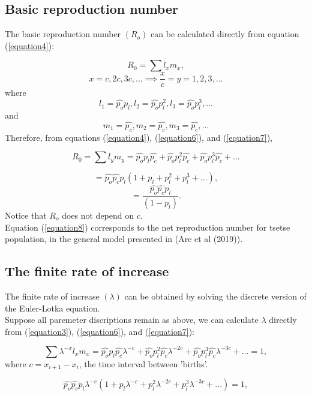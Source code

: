 \documentclass[10pt,a4paper]{article}
\begin{document}
\subsection*{Basic reproduction number}

The basic reproduction number $(R_o)$ can be calculated directly from equation (\ref{equation4}): 

$$R_{0 }=\sum l_{x}m_{x},$$
 $$x=c,2c,3c,... \implies \frac{x}{c}=y = 1,2,3,...$$ 
where
\begin{equation}
\label{equation6} 
l_{1}=\hat{p_o}p_l, l_{2}= \hat{p_o}p_l^2, l_{3}=\hat{p_o}p_l^3, . . .
\end{equation}
and
\begin{equation}
\label{equation7} 
m_{1}=\hat{p_c}, m_{2}=\hat{p_c}, m_{3}=\hat{p_c}, . . .
\end{equation}
Therefore, from equations (\ref{equation4}),  (\ref{equation6}), and  (\ref{equation7}),

$$R_{0 }=\sum l_{y}m_{y} = \hat{p_o}p_l\hat{p_c} + \hat{p_o}p_l^2\hat{p_c} + \hat{p_o}p_l^3\hat{p_c} + ...$$

$$=\hat{p_o}\hat{p_c}p_l (1 + p_l + p_l^2 + p_l^3 + ...),$$
\begin{equation}
\label{equation8} 
=\frac{\hat{p_o}\hat{p_c}p_l}{(1-p_l)}.
\end{equation}
Notice that $R_o$ does not depend on $c$.\\
Equation  (\ref{equation8}) corresponds to the net reproduction number for tsetse population, in the general model presented in (Are et al (2019)).

\subsection*{The finite rate of increase}


The finite rate of increase $(\lambda)$ can be obtained by solving the discrete version of the Euler-Lotka equation. \\

Suppose all paremeter discriptions remain as above, we can calculate  $\lambda$ directly from (\ref{equation3}), (\ref{equation6}), and  (\ref{equation7}):


$$\sum \lambda^{-x}l_{x}m_{x} = \hat{p_o}p_l\hat{p_c}\lambda^{-c} + \hat{p_o}p_l^2\hat{p_c}\lambda^{-2c} + \hat{p_o}p_l^3\hat{p_c}\lambda^{-3c} + ...=1,$$
where $c= x_{i+1} - x_{i} $, the time interval between 'births'.


$$\hat{p_o}\hat{p_c}p_l\lambda^{-c} (1 + p_l\lambda^{-c} + p_l^2\lambda^{-2c} + p_l^3\lambda^{-3c}+ ...) =1,$$
\end{document}
